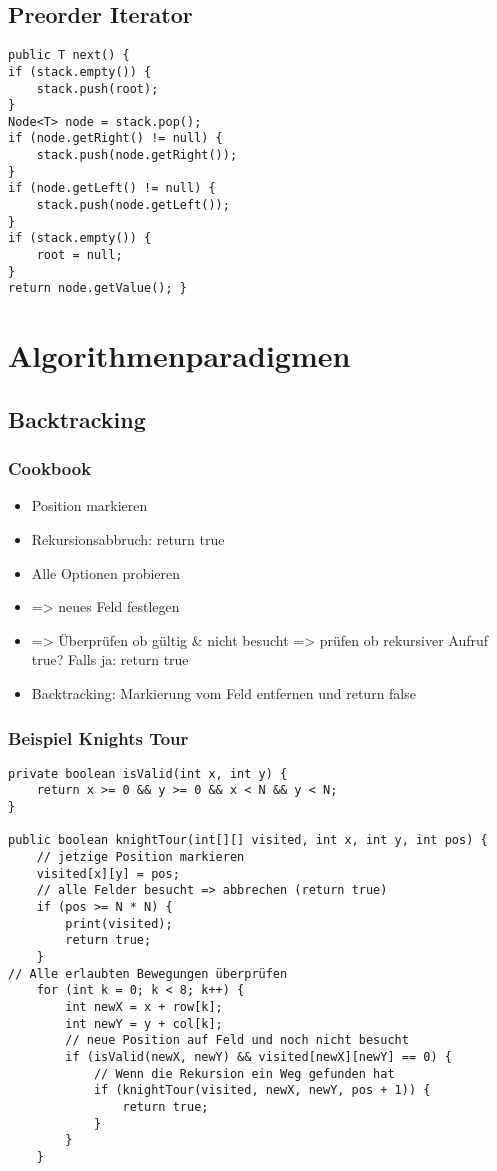 \begin{multicols*}{5}
	\subsection{Preorder Iterator}
		\begin{lstlisting}
public T next() {
if (stack.empty()) {
	stack.push(root);
}
Node<T> node = stack.pop();
if (node.getRight() != null) {
	stack.push(node.getRight());
}
if (node.getLeft() != null) {
	stack.push(node.getLeft());
}
if (stack.empty()) {
	root = null;
}
return node.getValue(); }
		\end{lstlisting}


\section{Algorithmenparadigmen}
	\subsection{Backtracking}
		\subsubsection{Cookbook}
			\begin{itemize}
				\item Position markieren
				\item Rekursionsabbruch: return true
				\item Alle Optionen probieren
					\item => neues Feld festlegen
					\item => Überprüfen ob gültig \& nicht besucht
					\subitem => prüfen ob rekursiver Aufruf true? 
					\subitem Falls ja: return true
				\item Backtracking: Markierung vom Feld entfernen und return false
			\end{itemize}			
		
		\subsubsection{Beispiel Knights Tour}
			\begin{lstlisting}
private boolean isValid(int x, int y) {
	return x >= 0 && y >= 0 && x < N && y < N;
}

public boolean knightTour(int[][] visited, int x, int y, int pos) {
	// jetzige Position markieren
	visited[x][y] = pos;
	// alle Felder besucht => abbrechen (return true)
	if (pos >= N * N) {
		print(visited);
		return true;
	}
// Alle erlaubten Bewegungen überprüfen
	for (int k = 0; k < 8; k++) {
		int newX = x + row[k];
		int newY = y + col[k];
		// neue Position auf Feld und noch nicht besucht
		if (isValid(newX, newY) && visited[newX][newY] == 0) {
			// Wenn die Rekursion ein Weg gefunden hat
			if (knightTour(visited, newX, newY, pos + 1)) {
				return true;
			}
		}
	}
	

\end{lstlisting}
\end{multicols*}
